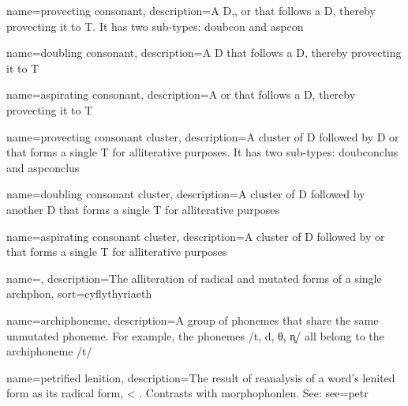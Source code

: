 \usepackage[%
            xindy,
            toc,
            acronym
            ]{glossaries}
\usepackage{glossary-mcols}

\makeglossaries
\usepackage[xindy]{imakeidx}
\makeindex


{
    name=provecting consonant,
    description={A \gls{D},, or  that follows a \gls{D}, thereby provecting it to \gls{T}. It has two sub-types: \gls{doubcon} and \gls{aspcon}}
}

{
    name=doubling consonant,
    description={A \gls{D} that follows a \gls{D}, thereby provecting it to \gls{T}}
}

{
    name=aspirating consonant,
    description={A  or  that follows a \gls{D}, thereby provecting it to \gls{T}}
}

{
    name=provecting consonant cluster,
    description={A cluster of \gls{D} followed by \gls{D} or  that forms a single \gls{T} for alliterative purposes. It has two sub-types: \gls{doubconclus} and \gls{aspconclus}}
}

{
    name=doubling consonant cluster,
    description={A cluster of \gls{D} followed by another \gls{D} that forms a single \gls{T} for alliterative purposes}
}

{
    name=aspirating consonant cluster,
    description={A cluster of \gls{D} followed by  or  that forms a single \gls{T} for alliterative purposes}
}

{
    name={},
    description={The alliteration of radical and mutated forms of a single \gls{archphon}},
    sort={cyflythyriaeth}
}

{
    name={archi\-phoneme},
    description={A group of phonemes that share the same unmutated phoneme. For example, the phonemes /t, d, θ, n̥/ all belong to the archiphoneme /t/}
}


{
  name={petrified lenition},
  description={The result of reanalysis of a word's lenited form as its radical form, \eg {} < . Contrasts with \gls{morphophonlen}. See: }
  see={petr}
}

